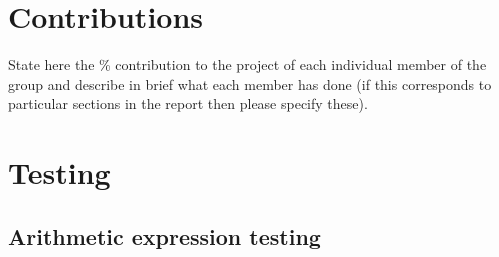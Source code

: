 \documentclass[a4paper, oneside, 11pt]{report}
\begin{document}
\appendix
\chapter{Contributions}

State here the \% contribution to the project of each individual member of the group and describe in brief what each member has done (if this corresponds to particular sections in the report then please specify these).

\chapter{Testing}
\label{app:test}
\section{Arithmetic expression testing}
\end{document}
